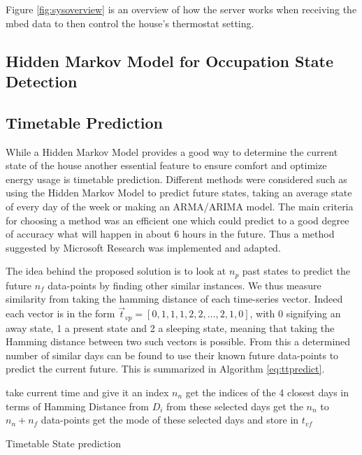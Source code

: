 \documentclass[10.5pt,a4paper,twoside]{report}   %
\begin{document}
Figure \ref{fig:sysoverview} is an overview of how the server works when receiving the mbed data to then control the house's thermostat setting.

\subsection{Hidden Markov Model for Occupation State Detection}
\subsection{Timetable Prediction}
\label{sec:ttpredictprog}
While a Hidden Markov Model provides a good way to determine the current state of the house another essential feature to ensure comfort and optimize energy usage is timetable prediction. Different methods were considered such as using the Hidden Markov Model to predict future states, taking an average state of every day of the week or making an ARMA/ARIMA model. The main criteria for choosing a method was an efficient one which could predict to a good degree of accuracy what will happen in about 6 hours in the future. Thus a method suggested by Microsoft Research \cite{msftresearch} was implemented and adapted.

The idea behind the proposed solution is to look at $n_p$ past states to predict the future $n_f$ data-points by finding other similar instances. We thus measure similarity from taking the hamming distance of each time-series vector. Indeed each vector is in the form $\vec{t}_{vp} = [0,1,1,1,2,2,\dots,2,1,0]$, with 0 signifying an away state, 1 a present state and 2 a sleeping state, meaning that taking the Hamming distance between two such vectors is possible. From this a determined number of similar days can be found to use their known future data-points to predict the current future. This is summarized in Algorithm \ref{eq:ttpredict}.\\

\begin{algorithm}[H]
 \SetAlgoLined
 take current time and give it an index $n_n$\;
 get the indices of the 4 closest days in terms of Hamming Distance from $D_i$\;
 from these selected days get the $n_n$ to $n_n+n_f$ data-points\;
 get the mode of these selected days and store in $t_{vf}$\;
 \label{eq:ttpredict}
 \caption{Timetable State prediction}
\end{algorithm}
\end{document}

